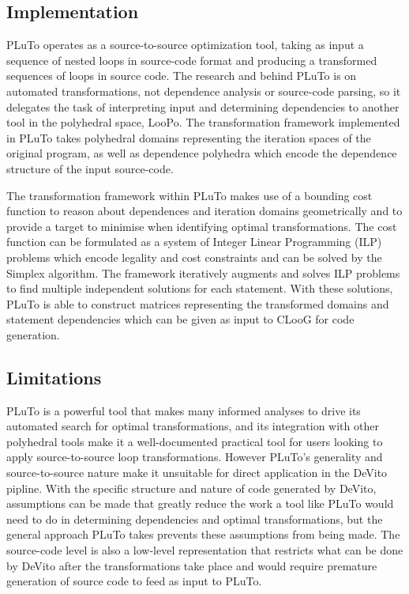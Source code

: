 \documentclass[a4paper,12pt,twoside]{report}
\begin{document}
\begin{itemize}
\subsection{Implementation}
PLuTo operates as a source-to-source optimization tool, taking as input a sequence of nested loops in source-code format
and producing a transformed sequences of loops in source code. The research and behind PLuTo is on automated transformations,
not dependence analysis or source-code parsing, so it delegates the task of interpreting input and determining dependencies
to another tool in the polyhedral space, LooPo. The transformation framework implemented in PLuTo takes polyhedral domains representing the iteration
spaces of the original program, as well as dependence polyhedra which encode the dependence structure of the input source-code.

The transformation framework within PLuTo makes use of a bounding cost function to reason about dependences and iteration domains
geometrically and to provide a target to minimise when identifying optimal transformations. The cost function can be formulated
as a system of Integer Linear Programming (ILP) problems which encode legality and cost constraints and can be solved by the Simplex
algorithm. The framework iteratively augments and solves ILP problems to find multiple independent solutions for each statement. With
these solutions, PLuTo is able to construct matrices representing the transformed domains and statement dependencies which can be
given as input to CLooG for code generation.

\subsection{Limitations}
PLuTo is a powerful tool that makes many informed analyses to drive its automated search for optimal transformations, and its integration
with other polyhedral tools make it a well-documented practical tool for users looking to apply source-to-source loop transformations. However
PLuTo's generality and source-to-source nature make it unsuitable for direct application in the DeVito pipline. With the specific structure and
nature of code generated by DeVito, assumptions can be made that greatly reduce the work a tool like PLuTo would need to do in determining
dependencies and optimal transformations, but the general approach PLuTo takes prevents these assumptions from being made. The source-code level
is also a low-level representation that restricts what can be done by DeVito after the transformations take place and would require premature
generation of source code to feed as input to PLuTo.


\end{itemize}
\end{document}
